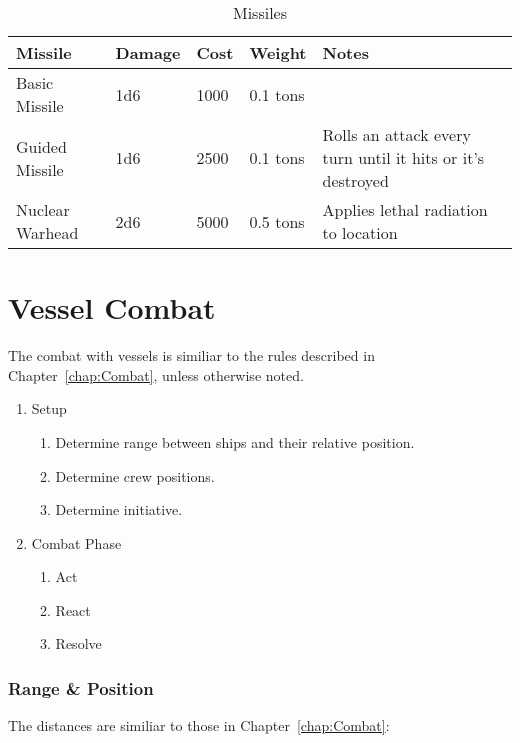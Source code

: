 \begin{table}
  \centering
  \caption{Missiles}
  \begin{tabularx}{\textwidth}{|l|l|l|l|X|}
    \hline
    Missile         & Damage & Cost & Weight   & Notes                                                      \\ \hline
    Basic Missile   & 1d6    & 1000 & 0.1 tons & ~                                                          \\ \hline
    Guided Missile  & 1d6    & 2500 & 0.1 tons & Rolls an attack every turn until it hits or it's destroyed \\ \hline
    Nuclear Warhead & 2d6    & 5000 & 0.5 tons & Applies lethal radiation to location                       \\ \hline
  \end{tabularx}
\end{table}

\chapter{Vessel Combat}
\label{chap:Vessel Combat}

The combat with vessels is similiar to the rules described in Chapter~\ref{chap:Combat}, unless otherwise noted.

\begin{enumerate}
  \item Setup
  \begin{enumerate}
    \item Determine range between ships and their relative position.
    \item Determine crew positions.
    \item Determine initiative.
  \end{enumerate}
  \item Combat Phase
  \begin{enumerate}
    \item Act
    \item React
    \item Resolve
  \end{enumerate}
\end{enumerate}

\subsection{Range \& Position}
\label{sub:Vessels-Combat-Setup-Range}

The distances are similiar to those in Chapter~\ref{chap:Combat}:

